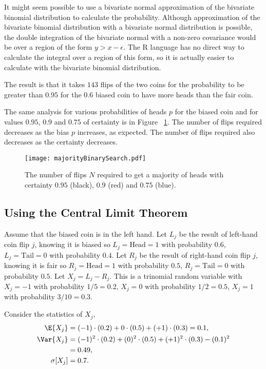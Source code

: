\documentclass[12pt]{article}
\begin{document}
It might seem possible to use a bivariate normal approximation of the
bivariate binomial distribution to calculate the probability.  Although
approximation of the bivariate binomial distribution with a bivariate
normal distribution is possible, the double integration of the bivariate
normal with a non-zero covariance would be over a region of the form \(
y > x-\epsilon \).  The R language has no direct way to calculate the
integral over a region of this form, so it is actually easier to
calculate with the bivariate binomial distribution.

The result is that it takes \( 143 \) flips of the two coins for the
probability to be greater than \( 0.95 \) for the \( 0.6 \) biased coin
to have more heads than the fair coin.

The same analysis for various probabilities of heads \( p \) for the
biased coin and for values \( 0.95 \), \( 0.9 \) and \( 0.75 \) of
certainty is in Figure~%
\ref{fig:twocoins:majorityBinarySearch}.  The number of flips required
decreases as the bias \( p \) increases, as expected.  The number of
flips required also decreases as the certainty decreases.

\begin{figure}[htbp]
    \centerline{\texttt{[image: majorityBinarySearch.pdf]}}
    \caption{The number of flips $ N $ required to get a majority of
    heads with certainty $ 0.95 $ (black), $ 0.9 $ (red) and $ 0.75$
    (blue).}%
    \label{fig:twocoins:majorityBinarySearch}
\end{figure}

\subsection*{Using the Central Limit Theorem}

Assume that the biased coin is in the left hand.%
Let \( L_j \) be the result of left-hand coin flip \( j \), knowing it
is biased so \( L_j = \text{Head} = 1 \) with probability \( 0.6 \), \(
L_j = \text{Tail} = 0 \) with probability \( 0.4 \).  Let \( R_j \) be
the result of right-hand coin flip \( j \), knowing it is fair so \( R_j
= \text{Head} = 1 \) with probability \( 0.5 \), \( R_j = \text{Tail} =
0 \) with probability \( 0.5 \).  Let \( X_j = L_j - R_j \).  This is a
trinomial random variable with \( X_j = -1 \) with probability \( 1/5 =
0.2 \), \( X_j = 0 \) with probability \( 1/2 = 0.5 \), \( X_j = 1 \)
with probability \( 3/10 = 0.3 \).

Consider the statistics of \( X_j \),
\begin{align*}
    \E{X_j} &= (-1)\cdot(0.2) + 0 \cdot (0.5) + (+1)\cdot(0.3) = 0.1, \\
    \Var{X_j} &= (-1)^2\cdot(0.2)+(0)^2\cdot(0.5)+(+1)^2\cdot(0.3)-(0.1)^2\\
    & =0.49, \\
    \sigma[X_j] &= 0.7.  \\
\end{align*}
\end{document}

